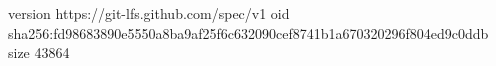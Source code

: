 version https://git-lfs.github.com/spec/v1
oid sha256:fd98683890e5550a8ba9af25f6c632090cef8741b1a670320296f804ed9c0ddb
size 43864
